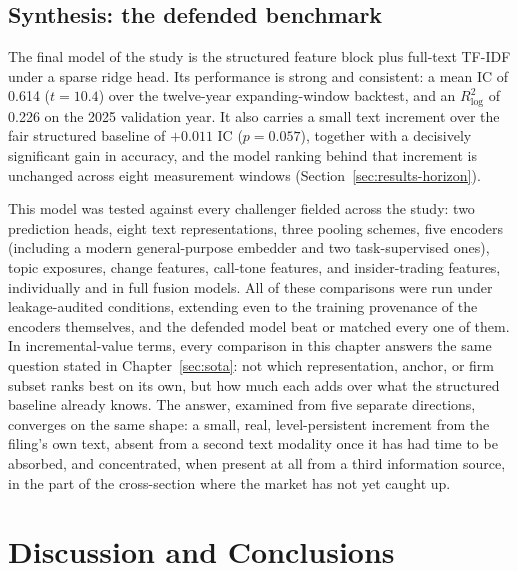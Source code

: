 \documentclass[logo,msc,ai]{infthesis}        %
\begin{document}
\section{Synthesis: the defended benchmark}
\label{sec:results-synth}
The final model of the study is the structured feature block plus full-text TF-IDF under a sparse ridge head. Its performance is strong and consistent: a mean IC of 0.614 ($t=10.4$) over the twelve-year expanding-window backtest, and an $R^2_{\log}$ of 0.226 on the 2025 validation year. It also carries a small text increment over the fair structured baseline of $+0.011$ IC ($p=0.057$), together with a decisively significant gain in accuracy, and the model ranking behind that increment is unchanged across eight measurement windows (Section~\ref{sec:results-horizon}).

This model was tested against every challenger fielded across the study: two prediction heads, eight text representations, three pooling schemes, five encoders (including a modern general-purpose embedder and two task-supervised ones), topic exposures, change features, call-tone features, and insider-trading features, individually and in full fusion models. All of these comparisons were run under leakage-audited conditions, extending even to the training provenance of the encoders themselves, and the defended model beat or matched every one of them. In incremental-value terms, every comparison in this chapter answers the same question stated in Chapter~\ref{sec:sota}: not which representation, anchor, or firm subset ranks best on its own, but how much each adds over what the structured baseline already knows. The answer, examined from five separate directions, converges on the same shape: a small, real, level-persistent increment from the filing's own text, absent from a second text modality once it has had time to be absorbed, and concentrated, when present at all from a third information source, in the part of the cross-section where the market has not yet caught up.

\chapter{Discussion and Conclusions}
\label{sec:discussion}
\end{document}

